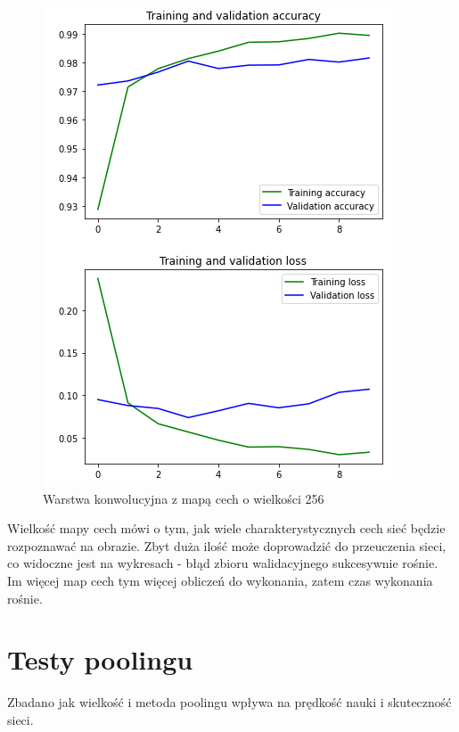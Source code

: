 \documentclass{article}
\begin{document}
\begin{figure}[!htb]
  \centering
  \includegraphics[width=\linewidth]{feature_256.png}
  \caption{Warstwa konwolucyjna z mapą cech o wielkości 256}
\end{figure}

Wielkość mapy cech mówi o tym, jak wiele charakterystycznych cech sieć będzie rozpoznawać na obrazie. 
Zbyt duża ilość może doprowadzić do przeuczenia sieci, co widoczne jest na wykresach - błąd zbioru walidacyjnego sukcesywnie rośnie.
Im więcej map cech tym więcej obliczeń do wykonania, zatem czas wykonania rośnie.

\section{Testy poolingu}

Zbadano jak wielkość i metoda poolingu wpływa na prędkość nauki i skuteczność sieci.
\end{document}
